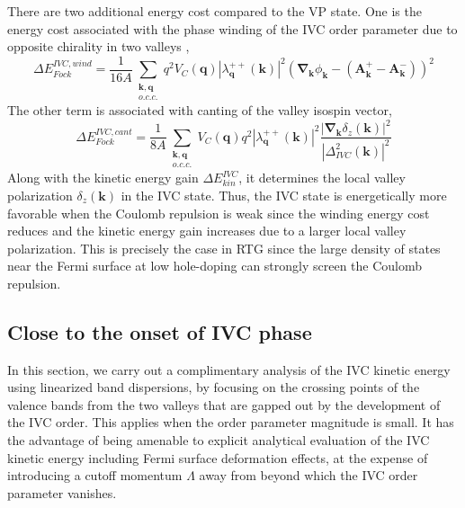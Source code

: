 \documentclass[aps,pra,twocolumn,superscriptaddress,10pt,article,nofootinbib,showpacs,longbibliography]{revtex4-1}
\def \k{{\mathbf k}}
\begin{document}
There are two additional energy cost compared to the VP state. One is the energy cost associated with the phase winding of the IVC order parameter due to opposite chirality in two valleys \cite{Goldhaber,Serlin2019,BCZ2020,ZMS2019,NickPRX}, 
\begin{equation}
    \Delta E_{Fock}^{IVC,wind} = \frac{1}{16 A} \sum_{\substack{\mathbf{k}, \mathbf{q}\\o.c.c.}} q^2 V_C(\boldsymbol{q}) |\lambda^{++}_{\boldsymbol{q}}(\boldsymbol{k})|^2  \left(\boldsymbol{\nabla}_{\boldsymbol{k}} \phi_{\boldsymbol{k}}-\left(\boldsymbol{A}^+_{\boldsymbol{k}}-\boldsymbol{A}^-_{\boldsymbol{k}}\right)\right)^{2}
\end{equation}
The other term is associated with canting of the valley isospin vector,
\begin{equation}
    \Delta E_{Fock}^{IVC,cant} = \frac{1}{8 A } \sum_{\substack{\mathbf{k}, \mathbf{q}\\o.c.c.}} V_C(\boldsymbol{q}) q^2 |\lambda^{++}_{\boldsymbol{q}}(\boldsymbol{k})|^2 \frac{\left | \boldsymbol{\nabla}_{\boldsymbol{k}} \delta_{z}(\k) \right |^2}{\left |\Delta^2_{IVC}(\k)\right|^2}
\end{equation}
Along with the kinetic energy gain $\Delta E_{kin}^{IVC}$, it determines the local valley polarization $\delta_{z}(\k)$ in the IVC state. Thus, the IVC state is energetically more favorable when the Coulomb repulsion is weak since the winding energy cost reduces and the kinetic energy gain increases due to a larger local valley polarization. This is precisely the case in RTG since the large density of states near the Fermi surface at low hole-doping can strongly screen the Coulomb repulsion. 


\subsection{Close to the onset of IVC phase}
In this section, we carry out a complimentary analysis of the IVC kinetic energy using linearized band dispersions, by focusing on the crossing points of the valence bands from the two valleys that are gapped out by the development of the IVC order. 
This applies when the order parameter magnitude is small.
It has the advantage of being amenable to explicit analytical evaluation of the IVC kinetic energy including Fermi surface deformation effects, at the expense of introducing a cutoff momentum $\Lambda$ away from  beyond which the IVC order parameter vanishes.
\end{document}
